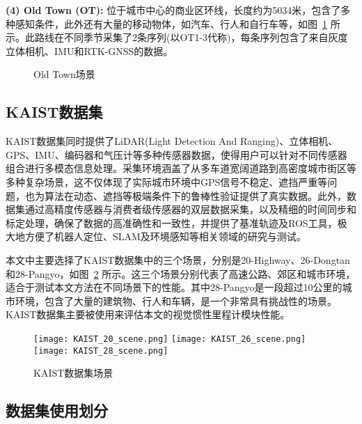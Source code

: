 \textbf{(4) Old Town (OT):} 位于城市中心的商业区环线，长度约为5034米，包含了多种感知条件，此外还有大量的移动物体，如汽车、行人和自行车等，如图~\ref{fig:OT_data} 所示。此路线在不同季节采集了2条序列(以OT1-3代称)，每条序列包含了来自灰度立体相机、IMU和RTK-GNSS的数据。

\begin{figure}
  \centering
  \caption{Old Town场景}
  \label{fig:OT_data}
\end{figure}

\subsection{KAIST数据集}
KAIST数据集\cite{jjeong-2019-ijrr}同时提供了LiDAR(Light Detection And Ranging)、立体相机、GPS、IMU、编码器和气压计等多种传感器数据，使得用户可以针对不同传感器组合进行多模态信息处理。采集环境涵盖了从多车道宽阔道路到高密度城市街区等多种复杂场景，这不仅体现了实际城市环境中GPS信号不稳定、遮挡严重等问题，也为算法在动态、遮挡等极端条件下的鲁棒性验证提供了真实数据。此外，数据集通过高精度传感器与消费者级传感器的双层数据采集，以及精细的时间同步和标定处理，确保了数据的高准确性和一致性，并提供了基准轨迹及ROS工具，极大地方便了机器人定位、SLAM及环境感知等相关领域的研究与测试。

本文中主要选择了KAIST数据集中的三个场景，分别是20-Highway、26-Dongtan和28-Pangyo，如图~\ref{fig:KAIST_data} 所示。这三个场景分别代表了高速公路、郊区和城市环境，适合于测试本文方法在不同场景下的性能。其中28-Pangyo是一段超过10公里的城市环境，包含了大量的建筑物、行人和车辆，是一个非常具有挑战性的场景。KAIST数据集主要被使用来评估本文的视觉惯性里程计模块性能。

\begin{figure}
  \centering
  \texttt{[image: KAIST\_20\_scene.png]}
  \texttt{[image: KAIST\_26\_scene.png]}
  \texttt{[image: KAIST\_28\_scene.png]}
  \caption{KAIST数据集场景}
  \label{fig:KAIST_data}
\end{figure}

\subsection{数据集使用划分}

